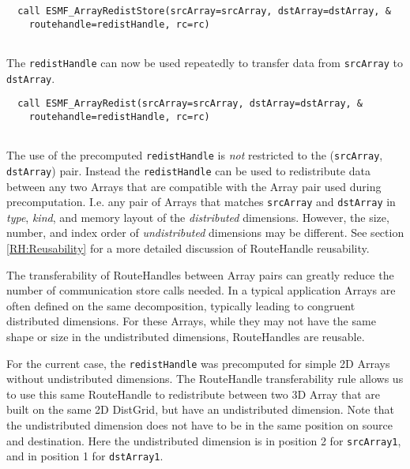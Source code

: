  \begin{verbatim}
  call ESMF_ArrayRedistStore(srcArray=srcArray, dstArray=dstArray, &
    routehandle=redistHandle, rc=rc)
 
\end{verbatim}
 
 

   The {\tt redistHandle} can now be used repeatedly to transfer data from
   {\tt srcArray} to {\tt dstArray}. 

 \begin{verbatim}
  call ESMF_ArrayRedist(srcArray=srcArray, dstArray=dstArray, &
    routehandle=redistHandle, rc=rc)
 
\end{verbatim}
 

   \begin{sloppypar}
   The use of the precomputed {\tt redistHandle} is {\em not} restricted to
   the ({\tt srcArray}, {\tt dstArray}) pair. Instead the {\tt redistHandle}
   can be used to redistribute data between any two Arrays that are compatible
   with the Array pair used during precomputation. I.e. any pair of Arrays that
   matches {\tt srcArray} and {\tt dstArray} in {\em type}, {\em kind}, and 
   memory layout of the {\em distributed} dimensions. However, the size, number, 
   and index order of {\em undistributed} dimensions may be different.
   See section \ref{RH:Reusability} for a more detailed discussion of
   RouteHandle reusability.
   \end{sloppypar}
  
   The transferability of RouteHandles between Array pairs can greatly reduce
   the number of communication store calls needed.
   In a typical application Arrays are often defined on the same decomposition,
   typically leading to congruent distributed dimensions. For these Arrays, while
   they may not have the same shape or size in the undistributed dimensions,
   RouteHandles are reusable.
  
   For the current case, the {\tt redistHandle} was precomputed for simple 2D
   Arrays without undistributed dimensions. The RouteHandle transferability
   rule allows us to use this same RouteHandle to redistribute between two 
   3D Array that are built on the same 2D DistGrid, but have an undistributed
   dimension. Note that the undistributed dimension does not have to be in the
   same position on source and destination. Here the undistributed dimension is
   in position 2 for {\tt srcArray1}, and in position 1 for {\tt dstArray1}. 

